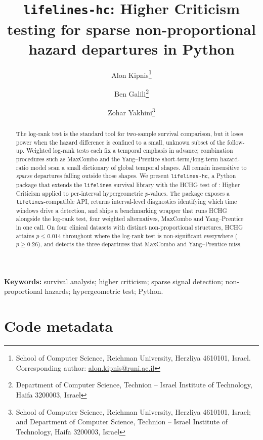 \documentclass[11pt]{article}
\title{\texttt{lifelines-hc}: Higher Criticism testing for sparse
  non-proportional hazard departures in Python}
\author{%
  Alon Kipnis\thanks{School of Computer Science, Reichman University,
    Herzliya 4610101, Israel. Corresponding author:
    \href{mailto:alon.kipnis@runi.ac.il}{alon.kipnis@runi.ac.il}}
  \and
  Ben Galili\thanks{Department of Computer Science, Technion -- Israel
    Institute of Technology, Haifa 3200003, Israel}
  \and
  Zohar Yakhini\thanks{School of Computer Science, Reichman University,
    Herzliya 4610101, Israel; and Department of Computer Science,
    Technion -- Israel Institute of Technology, Haifa 3200003, Israel}%
}
\date{}
\begin{document}
\maketitle

\begin{abstract}
The log-rank test is the standard tool for two-sample survival comparison,
but it loses power when the hazard difference is confined to a small,
unknown subset of the follow-up. Weighted log-rank tests each fix a
temporal emphasis in advance; combination procedures such as MaxCombo and
the Yang--Prentice short-term/long-term hazard-ratio model scan a small
dictionary of global temporal shapes. All remain insensitive to \emph{sparse}
departures falling outside those shapes. We present \texttt{lifelines-hc},
a Python package that extends the \texttt{lifelines} survival library with
the HCHG test of \citet{kipnis_biometrika}: Higher Criticism applied to
per-interval hypergeometric $p$-values. The package exposes a
\texttt{lifelines}-compatible API, returns interval-level diagnostics
identifying which time windows drive a detection, and ships a benchmarking
wrapper that runs HCHG alongside the log-rank test, four weighted
alternatives, MaxCombo and Yang--Prentice in one call. On four clinical
datasets with distinct non-proportional structures, HCHG attains
$p \leq 0.014$ throughout where the log-rank test is non-significant
everywhere ($p \geq 0.26$), and detects the three departures that MaxCombo
and Yang--Prentice miss.
\end{abstract}

\noindent\textbf{Keywords:} survival analysis; higher criticism; sparse
signal detection; non-proportional hazards; hypergeometric test; Python.

\vspace{1em}

\section*{Code metadata}
\end{document}
